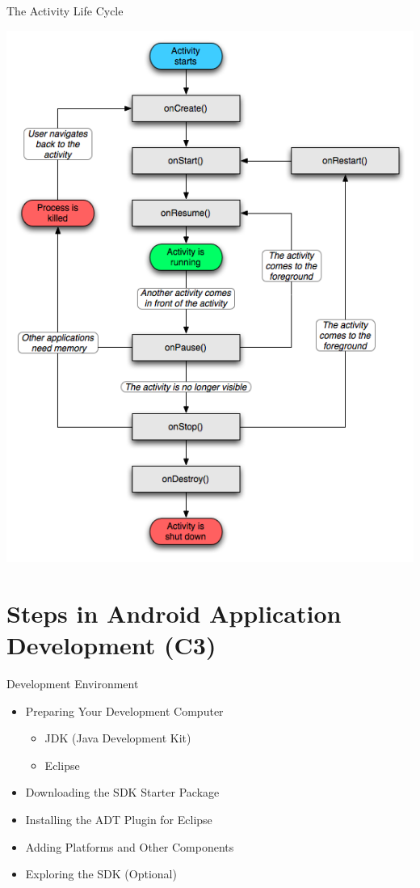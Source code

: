 \begin{frame}{The Activity Life Cycle}
\begin{center}
\includegraphics[scale=0.25]{images/life_cycle}
\end{center}
\end{frame}

\section{Steps in Android Application Development (C3)}

\begin{frame}{Development Environment}
\begin{itemize}
  \item Preparing Your Development Computer
  \begin{itemize}
  \item JDK (Java Development Kit)
  \item Eclipse
  \end{itemize}
  \item Downloading the SDK Starter Package
  \item Installing the ADT Plugin for Eclipse
  \item Adding Platforms and Other Components
  \item Exploring the SDK (Optional)
\end{itemize}
\end{frame}

